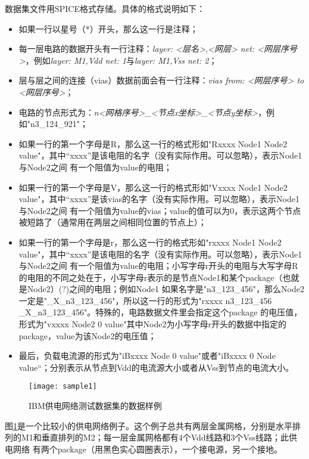 数据集文件用SPICE格式存储。具体的格式说明如下：

\begin{itemize}
\item 如果一行以星号（*）开头，那么这一行是注释；
\item 每一层电路的数据开头有一行注释：\emph{layer: <层名>,<网层> net: <网层序号>}，例如\emph{layer: M1,Vdd net: 1}与\emph{layer: M1,Vss net: 2}；
\item 层与层之间的连接（vias）数据前面会有一行注释：\emph{vias from: <网层序号> to <网层序号>}；
\item 电路的节点形式为：\emph{n<网格序号>\_<节点x坐标>\_<节点y坐标>}，例如"n3\_124\_921"；
\item 如果一行的第一个字母是R，那么这一行的格式形如"Rxxxx Node1 Node2 value"，其中“xxxx”是该电阻的名字（没有实际作用。可以忽略），表示Node1与Node2之间
有一个阻值为value的电阻；
\item 如果一行的第一个字母是V，那么这一行的格式形如"Vxxxx Node1 Node2 value"，其中“xxxx”是该vias的名字（没有实际作用。可以忽略），表示Node1与Node2之间
有一个阻值为value的vias；value的值可以为0，表示这两个节点被短路了（通常用在两层之间相同位置的节点上）；
\item 如果一行的第一个字母是r，那么这一行的格式形如"rxxxx Node1 Node2 value"，其中“xxxx”是该电阻的名字（没有实际作用。可以忽略），表示Node1与Node2之间
有一个阻值为value的电阻；小写字母r开头的电阻与大写字母R的电阻的不同之处在于，小写字母r表示的是节点Node1和某个package（也就是Node2）(?)之间的电阻；例如Node1
如果名字是"n3\_123\_456"，那么Node2一定是"\_X\_n3\_123\_456"，所以这一行的形式为"rxxxx n3\_123\_456 \_X\_n3\_123\_456"。特殊的，电路数据文件里会指定这个package
的电压值，形式为"vxxxx Node2 0 value"其中Node2为小写字母r开头的数据中指定的package，value为该Node2的电压值；
\item 最后，负载电流源的形式为"iBxxxx Node 0 value"或者"iBxxxx 0 Node value“；分别表示从节点到Vdd的电流源大小或者从Vss到节点的电流大小。
\end{itemize}

\begin{figure}[H]
  \centering
  \texttt{[image: sample1]}
  \caption{IBM供电网络测试数据集的数据样例}
  \label{fig:figsample1}
\end{figure}

图\ref{fig:figsample1}是一个比较小的供电网络例子。这个例子总共有两层金属网格，分别是水平排列的M1和垂直排列的M2；每一层金属网格都有4个Vdd线路和3个Vss线路；此供电网络
有两个package（用黑色实心圆圈表示），一个接电源，另一个接地。

